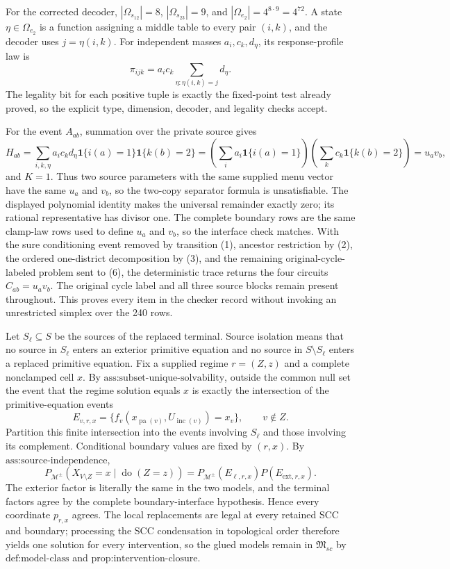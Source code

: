 For the corrected decoder, \(|\Omega_{s_{12}}|=8\), \(|\Omega_{s_{23}}|=9\), and \(|\Omega_{e_2}|=4^{8\cdot9}=4^{72}\).  A state \(\eta\in\Omega_{e_2}\) is a function assigning a middle table to every pair \((i,k)\), and the decoder uses \(j=\eta(i,k)\).  For independent masses \(a_i,c_k,d_\eta\), its response-profile law is
\[
 \pi_{ijk}=a_ic_k\sum_{\eta:\eta(i,k)=j}d_\eta.
\]
The legality bit for each positive tuple is exactly the fixed-point test already proved, so the explicit type, dimension, decoder, and legality checks accept.

For the event \(A_{ab}\), summation over the private source gives
\[
 H_{ab}=\sum_{i,k,\eta}a_ic_kd_\eta\mathbf 1\{i(a)=1\}\mathbf 1\{k(b)=2\}
 =\left(\sum_i a_i\mathbf 1\{i(a)=1\}\right)
  \left(\sum_k c_k\mathbf 1\{k(b)=2\}\right)=u_av_b,
\]
and \(K=1\).  Thus two source parameters with the same supplied menu vector have the same \(u_a\) and \(v_b\), so the two-copy separator formula is unsatisfiable.  The displayed polynomial identity makes the universal remainder exactly zero; its rational representative has divisor one.  The complete boundary rows are the same clamp-law rows used to define \(u_a\) and \(v_b\), so the interface check matches.  With the sure conditioning event removed by transition (1), ancestor restriction by (2), the ordered one-district decomposition by (3), and the remaining original-cycle-labeled problem sent to (6), the deterministic trace returns the four circuits \(C_{ab}=u_av_b\).  The original cycle label and all three source blocks remain present throughout.  This proves every item in the checker record without invoking an unrestricted simplex over the 240 rows.

Let \(S_\ell\subseteq S\) be the sources of the replaced terminal.  Source isolation means that no source in \(S_\ell\) enters an exterior primitive equation and no source in \(S\setminus S_\ell\) enters a replaced primitive equation.  Fix a supplied regime \(r=(Z,z)\) and a complete nonclamped cell \(x\).  By \(\text{ass:subset-unique-solvability}\), outside the common null set the event that the regime solution equals \(x\) is exactly the intersection of the primitive-equation events
\[
 E_{v,r,x}=\{f_v(x_{\operatorname{pa}(v)},U_{\operatorname{inc}(v)})=x_v\},\qquad v\notin Z.
\]
Partition this finite intersection into the events involving \(S_\ell\) and those involving its complement.  Conditional boundary values are fixed by \((r,x)\).  By \(\text{ass:source-independence}\),
\[
 P_{\mathcal M^\pm}(X_{V\setminus Z}=x\mid\operatorname{do}(Z=z))
 =P_{\mathcal M^\pm}(E_{\ell,r,x})P(E_{\mathrm{ext},r,x}).
\]
The exterior factor is literally the same in the two models, and the terminal factors agree by the complete boundary-interface hypothesis.  Hence every coordinate \(p_{r,x}\) agrees.  The local replacements are legal at every retained SCC and boundary; processing the SCC condensation in topological order therefore yields one solution for every intervention, so the glued models remain in \(\mathfrak M_{sc}\) by \(\text{def:model-class}\) and \(\text{prop:intervention-closure}\).

